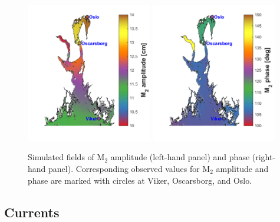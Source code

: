 \begin{figure}[hb] 
\centerline{ 
\includegraphics*[trim=1cm 0cm 0cm 0cm,clip=true,width=0.49\textwidth]{Figurer/M2amp_felt}  
\includegraphics*[trim=0.8cm 0cm 0cm 0cm,clip=true,width=0.49\textwidth]{Figurer/M2fase_felt} 
} 
\caption{\small 
Simulated fields of M$_2$ amplitude (left-hand panel) and phase (right-hand panel). Corresponding observed values for M$_2$ amplitude and phase are marked with circles at Viker, Oscarsborg, and Oslo.} 
\label{fig:M2field} 
\end{figure} 



\clearpage 
\subsection{Currents}
\label{subsec:curree}



